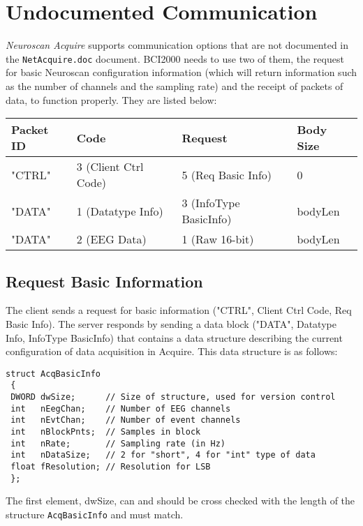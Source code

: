 \documentclass[letterpaper, oneside, 12pt]{article}
\begin{document}
\section{Undocumented Communication}

\emph{Neuroscan Acquire} supports communication options that are not documented 
in the \texttt{NetAcquire.doc} document. BCI2000 needs to use two of them, the 
request for basic Neuroscan configuration information (which will return 
information such as the number of channels and the sampling rate) and the 
receipt of packets of data, to function properly. They are listed below:\\

\begin{tabular}{|l|l|l|l|}
 \hline
 \textbf{Packet ID} & \textbf{Code} & \textbf{Request}   & \textbf{Body Size} \\
 \hline
 \hline
 "CTRL"   & 3 (Client Ctrl Code)    & 5 (Req Basic Info) & 0\\
 "DATA"   & 1 (Datatype Info)       & 3 (InfoType BasicInfo) & bodyLen \\
 "DATA"   & 2 (EEG Data)            & 1 (Raw 16-bit)     & bodyLen \\
 \hline
\end{tabular}

\subsection{Request Basic Information}

The client sends a request for basic information ("CTRL", Client Ctrl Code, Req 
Basic Info). The server responds by sending a data block ("DATA", Datatype Info, 
InfoType BasicInfo) that contains a data structure describing the current 
configuration of data acquisition in Acquire. This data structure is as follows:

\begin{verbatim}
struct AcqBasicInfo
 {
 DWORD dwSize;      // Size of structure, used for version control
 int   nEegChan;    // Number of EEG channels
 int   nEvtChan;    // Number of event channels
 int   nBlockPnts;  // Samples in block
 int   nRate;       // Sampling rate (in Hz)
 int   nDataSize;   // 2 for "short", 4 for "int" type of data
 float fResolution; // Resolution for LSB
 };
\end{verbatim}

The first element, dwSize, can and should be cross checked with the length of 
the structure \texttt{AcqBasicInfo} and must match.
\end{document}
